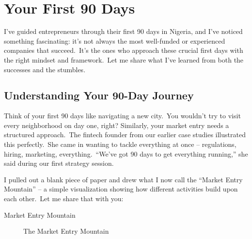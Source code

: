 \chapter{Your First 90 Days}\label{ch:first-90-days}

\begin{importantbox}
I've guided entrepreneurs through their first 90 days in Nigeria, and I've noticed something fascinating: it's not always the most well-funded or experienced companies that succeed.\ It's the ones who approach these crucial first days with the right mindset and framework.\ Let me share what I've learned from both the successes and the stumbles.
\end{importantbox}

\section{Understanding Your 90-Day Journey}\label{sec:understanding-90-day-journey}

Think of your first 90 days like navigating a new city.\ You wouldn't try to visit every neighborhood on day one, right?
Similarly, your market entry needs a structured approach.\ The fintech founder from our earlier case studies illustrated this perfectly.\ She came in wanting to tackle everything at once – regulations, hiring, marketing, everything.\ ``We've got 90 days to get everything running,'' she said during our first strategy session.

I pulled out a blank piece of paper and drew what I now call the ``Market Entry Mountain'' – a simple visualization showing how different activities build upon each other.\ Let me share that with you:

 Market Entry Mountain
\begin{figure}[H]
    \centering
    \caption{The Market Entry Mountain}
    \label{fig:market-entry-mountain}
\end{figure}

